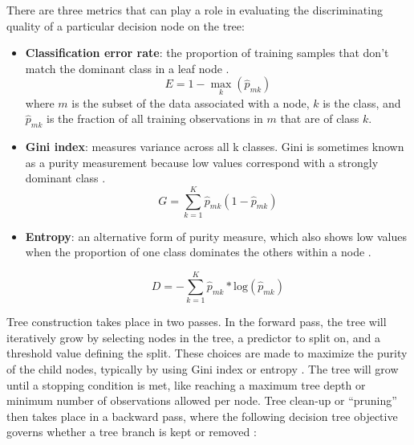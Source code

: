 There are three metrics that can play a role in evaluating the discriminating quality of a particular decision node on the tree:

\begin{itemize}[itemsep=2pt]\label{ch3:impurity}
    \item \textbf{Classification error rate}: the proportion of training samples that don't match the dominant class in a leaf node \citep[p. 312]{james_introduction_2013}.
    \begin{equation}
    \label{eq:error_rate}
        E = 1 - \max_k(\hat{p}_{mk})
    \end{equation}
    where $m$ is the subset of the data associated with a node, $k$ is the class, and $\hat{p}_{mk}$ is the fraction of all training observations in $m$ that are of class $k$. 
    \item \textbf{Gini index}: measures variance across all k classes. Gini is sometimes known as a purity measurement because low values correspond with a strongly dominant class \citep[p. 312]{james_introduction_2013}.
    \begin{equation}
    \label{eq:gini}
        G = \sum_{k=1}^{K}{\hat{p}_{mk}(1-\hat{p}_{mk})}
    \end{equation}
    \item \textbf{Entropy}: an alternative form of purity measure, which also shows low values when the proportion of one class dominates the others within a node \citep[p. 312]{james_introduction_2013}.
    
    \begin{equation}
    \label{eq:entropy}
        D = -\sum_{k=1}^{K}{\hat{p}_{mk}* \text{log}(\hat{p}_{mk})}
    \end{equation}
\end{itemize}

Tree construction takes place in two passes. In the forward pass, the tree will iteratively grow by selecting nodes in the tree, a predictor to split on, and a threshold value defining the split. These choices are made to maximize the purity of the child nodes, typically by using Gini index or entropy \citep[p. 307]{james_introduction_2013}. The tree will grow until a stopping condition is met, like reaching a maximum tree depth or minimum number of observations allowed per node. Tree clean-up or ``pruning'' then takes place in a backward pass, where the following decision tree objective governs whether a tree branch is kept or removed \citep[p. 309]{james_introduction_2013}:

